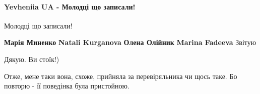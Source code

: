  
 
 
 
 

\paragraph{Yevheniia UA - Молодці що записали!}

\begin{itemize}
 
Молодці що записали!

 
\textbf{Марія Миненко} \textbf{Natali Kurganova} \textbf{Олена Олійник} \textbf{Marina Fadeeva}
Звітую


\begin{itemize}
 
Дякую. Ви стоїк!)

 
Отже, мене таки вона, схоже, прийняла за перевіряльника чи щось таке. Бо повторю - її поведінка була пристойною.
\end{itemize}

 

\end{itemize}
